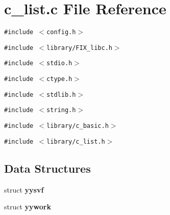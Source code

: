 \section{c\_\-list.c File Reference}
\label{c__list_8c}
{\tt \#include $<$config.h$>$}\par
{\tt \#include $<$library/FIX\_\-libc.h$>$}\par
{\tt \#include $<$stdio.h$>$}\par
{\tt \#include $<$ctype.h$>$}\par
{\tt \#include $<$stdlib.h$>$}\par
{\tt \#include $<$string.h$>$}\par
{\tt \#include $<$library/c\_\-basic.h$>$}\par
{\tt \#include $<$library/c\_\-list.h$>$}\par
\subsection*{Data Structures}
\begin{CompactItemize}
\item 
struct \bf{yysvf}
\item 
struct \bf{yywork}
\end{CompactItemize}
